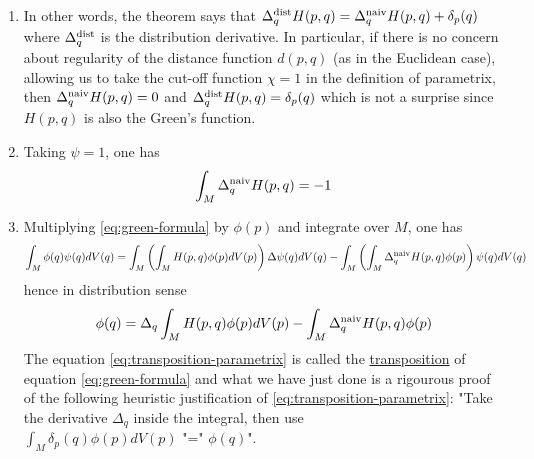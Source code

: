 \begin{remark}
\label{rem:transposition}
\begin{enumerate}
\item In other words, the theorem says that \(\Delta_q^{\rm dist} H(p,q) = \Delta_q^{\rm naiv}H(p,q) + \delta_p(q)\) where \(\Delta_q^{\rm dist}\) is the distribution
derivative. In particular, if there is no concern about regularity of the distance
function \(d(p,q)\) (as in the Euclidean case), allowing us to take the cut-off
function \(\chi=1\) in the definition of parametrix, then
\(\Delta_q^{\rm naiv}H(p,q) = 0\) and \(\Delta_q^{\rm dist}H(p,q) = \delta_p(q)\)
which is not a surprise since \(H(p,q)\) is also the Green's function.
\item Taking \(\psi=1\), one has
\[
    \int_M \Delta_q^{\rm naiv}H(p,q) = -1
   \]
\item Multiplying \eqref{eq:green-formula} by \(\phi(p)\) and integrate over \(M\), one has
\[
   \int_M \phi(q) \psi(q) dV(q) = \int_M \left(\int_M H(p,q) \phi(p) dV(p)\right)\Delta\psi(q)
   dV(q) - \int_M\left(\int_M \Delta_q^{\rm naiv} H(p,q)\phi(p)\right) \psi(q) dV(q)
   \]
hence in distribution sense
\begin{equation}
\label{eq:transposition-parametrix}
\phi(q) = \Delta_q \int_M H(p,q)\phi(p) dV(p) - \int_M \Delta_q^{\rm naiv} H(p,q)\phi(p)
\end{equation}
The equation \eqref{eq:transposition-parametrix} is called the \uline{transposition} of
equation \eqref{eq:green-formula} and what we have just done is a rigourous proof of the
following heuristic justification of \eqref{eq:transposition-parametrix}: "Take the
derivative \(\Delta_q\) inside the integral, then use \(\int_M \delta_p(q)\phi(p)
   dV(p) \text{ "=" } \phi(q)\)".
\end{enumerate}
\end{remark}



